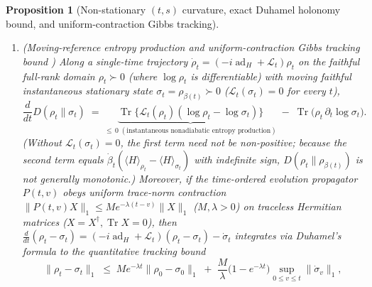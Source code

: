 \documentclass[11pt,a4paper]{article}
\newtheorem{proposition}{Proposition}
\theoremstyle{definition}
\theoremstyle{remark}
\newcommand{\Tr}{\operatorname{Tr}}
\newcommand{\ad}{\operatorname{ad}}
\newcommand{\cL}{\mathcal{L}}
\newcommand{\1}{\mathbf{1}}
\begin{document}
\begin{proposition}[Non-stationary $(t,s)$ curvature, exact Duhamel holonomy bound, and uniform-contraction Gibbs tracking]
\begin{enumerate}
  \item[(b)] \emph{(Moving-reference entropy production and uniform-contraction Gibbs tracking bound \cite{ChetriteMallick2012,HorowitzSagawa2014})} Along a single-time trajectory $\dot{\rho}_t = (-i\ad_H + \cL_t)\rho_t$ on the faithful full-rank domain $\rho_t \succ 0$ (where $\log\rho_t$ is differentiable) with moving faithful instantaneous stationary state $\sigma_t = \rho_{\beta(t)} \succ 0$ ($\cL_t(\sigma_t)=0$ for every $t$),
  \begin{equation}\label{eq:moving-rel-ent}
    \frac{d}{dt} D(\rho_t \| \sigma_t)
    \;=\; \underbrace{\Tr\bigl\{\cL_t(\rho_t)(\log\rho_t - \log\sigma_t)\bigr\}}_{\le\, 0\;(\text{instantaneous nonadiabatic entropy production})}
          \;-\; \Tr\bigl(\rho_t\,\partial_t\log\sigma_t\bigr).
  \end{equation}
  (Without $\cL_t(\sigma_t)=0$, the first term need not be non-positive; because the second term equals $\dot{\beta}_t(\langle H\rangle_{\rho_t}-\langle H\rangle_{\sigma_t})$ with indefinite sign, $D(\rho_t\|\rho_{\beta(t)})$ is not generally monotonic.) Moreover, if the time-ordered evolution propagator $P(t,v)$ obeys uniform trace-norm contraction $\|P(t,v)X\|_1 \le M e^{-\lambda(t-v)}\|X\|_1$ ($M,\lambda > 0$) on traceless Hermitian matrices ($X=X^\dagger, \Tr X=0$), then $\frac{d}{dt}(\rho_t-\sigma_t)=(-i\ad_H+\cL_t)(\rho_t-\sigma_t)-\dot{\sigma}_t$ integrates via Duhamel's formula to the quantitative tracking bound
  \begin{equation}\label{eq:gibbs-tracking-bound}
    \|\rho_t - \sigma_t\|_1
    \;\le\; M e^{-\lambda t}\|\rho_0 - \sigma_0\|_1
          \;+\; \frac{M}{\lambda}\bigl(1 - e^{-\lambda t}\bigr)\sup_{0\le v\le t}\|\dot{\sigma}_v\|_1,
  \end{equation}

\end{enumerate}
\end{proposition}
\end{document}
